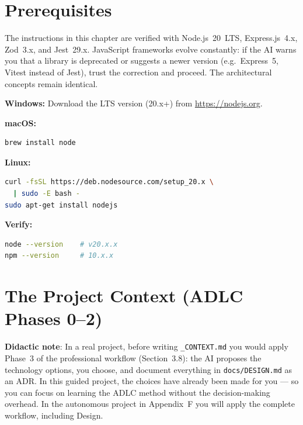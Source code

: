 \section{Prerequisites}

\begin{versionbox}
The instructions in this chapter are verified with Node.js~20~LTS, Express.js~4.x, Zod~3.x, and Jest~29.x. JavaScript frameworks evolve constantly: if the AI warns you that a library is deprecated or suggests a newer version (e.g.\ Express~5, Vitest instead of Jest), trust the correction and proceed. The architectural concepts remain identical.
\end{versionbox}

\begin{praticabox}[title={Hands-on --- Installing Node.js}]
\textbf{Windows:} Download the LTS version (20.x+) from \url{https://nodejs.org}.

\textbf{macOS:}
\begin{lstlisting}[language=bash]
brew install node
\end{lstlisting}

\textbf{Linux:}
\begin{lstlisting}[language=bash]
curl -fsSL https://deb.nodesource.com/setup_20.x \
  | sudo -E bash -
sudo apt-get install nodejs
\end{lstlisting}

\textbf{Verify:}
\begin{lstlisting}[language=bash]
node --version    # v20.x.x
npm --version     # 10.x.x
\end{lstlisting}
\end{praticabox}

\section{The Project Context (ADLC Phases 0--2)}

\begin{notebox}
\textbf{Didactic note}: In a real project, before writing \texttt{\_CONTEXT.md} you would apply Phase~3 of the professional workflow (Section~3.8): the AI proposes the technology options, you choose, and document everything in \texttt{docs/DESIGN.md} as an ADR. In this guided project, the choices have already been made for you --- so you can focus on learning the ADLC method without the decision-making overhead. In the autonomous project in Appendix~F you will apply the complete workflow, including Design.
\end{notebox}

